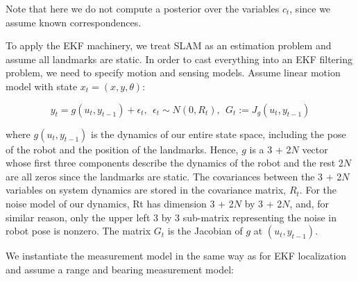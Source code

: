 Note that here we do not compute a posterior over the variables $c_t$, since we assume known correspondences.

To apply the EKF machinery, we treat SLAM as an estimation problem and assume all landmarks are static. In order to cast everything into an EKF filtering problem, we need to specify motion and sensing models. Assume linear motion model with state $x_t = (x, y, \theta)$:

\begin{equation}
    y_t = g(u_t, y_{t-1}) + \epsilon_t, \> \>
    \epsilon_t \sim N(0,R_t), \> \>
    G_t := J_g(u_t, y_{t-1})
\end{equation}

where $g(u_t,y_{t-1})$ is the dynamics of our entire state space, including the pose of the robot and the position of the landmarks. Hence, $g$ is a 3 + 2$N$ vector  whose first three components describe the dynamics of the robot and the rest 2$N$ are all zeros since the landmarks are static. The covariances between the 3 + 2$N$
variables on system dynamics are stored in the covariance matrix, $R_{t}$. For the noise model of our dynamics, Rt has dimension 3 + 2$N$ by 3 + 2$N$, and, for similar reason, only the upper left 3 by 3 sub-matrix representing the noise in robot pose is nonzero. The matrix $G_{t}$ is the Jacobian of $g$ at $(u_{t}, y_{t-1})$.

We instantiate the measurement model in the same way as for EKF localization and assume a range and bearing measurement model:

